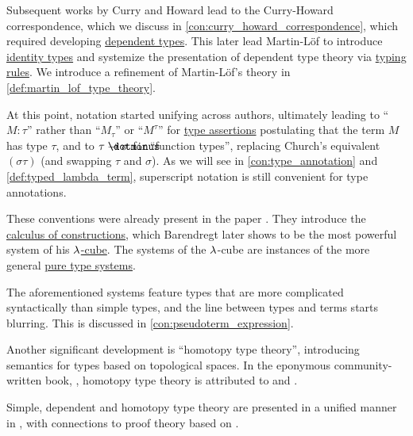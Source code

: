 \begin{remark}
  Subsequent works by Curry and Howard lead to the Curry-Howard correspondence, which we discuss in \cref{con:curry_howard_correspondence}, which required developing \hyperref[con:dependent_type]{dependent types}. This later lead Martin-Löf to introduce \hyperref[def:identity_type]{identity types} and systemize the presentation of dependent type theory via \hyperref[con:typing_rule]{typing rules}. We introduce a refinement of Martin-L\"of's theory in \cref{def:martin_lof_type_theory}.

  At this point, notation started unifying across authors, ultimately leading to \enquote{\( M: \tau \)} rather than \enquote{\( M_\tau \)} or \enquote{\( M^\tau \)} for \hyperref[def:type_assertion]{type assertions} postulating that the term \( M \) has type \( \tau \), and to \( \tau \synimplies \sigma \) for \enquote{function types}, replacing Church's equivalent \( (\sigma\tau) \) (and swapping \( \tau \) and \( \sigma \)). As we will see in \cref{con:type_annotation} and \cref{def:typed_lambda_term}, superscript notation is still convenient for type annotations.

  These conventions were already present in the paper . They introduce the \hyperref[def:lambda_cube/combinations]{calculus of constructions}, which Barendregt later shows to be the most powerful system of his \hyperref[def:lambda_cube]{\( {\mathrm \lambda} \)-cube}. The systems of the \( {\mathrm \lambda} \)-cube are instances of the more general \hyperref[def:pure_type_system]{pure type systems}.

  The aforementioned systems feature types that are more complicated syntactically than simple types, and the line between types and terms starts blurring. This is discussed in \cref{con:pseudoterm_expression}.

  Another significant development is \enquote{homotopy type theory}, introducing semantics for types based on topological spaces. In the eponymous community-written book, \cite{UnivalentFoundationsProgram2013HoTT}, homotopy type theory is attributed to \cite{Voevodski2006HoTT} and \cite{AwodeyWarren2009HoTT}.
\end{remark}
\begin{comments}
  \item Simple, dependent and homotopy type theory are presented in a unified manner in \cite{Mimram2020ProgramEqualsProof}, with connections to proof theory based on .
\end{comments}

